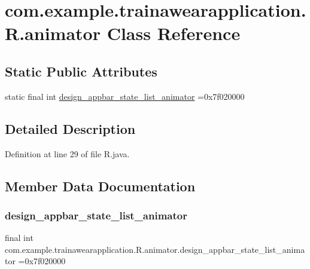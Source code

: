 \hypertarget{classcom_1_1example_1_1trainawearapplication_1_1_r_1_1animator}{}\section{com.\+example.\+trainawearapplication.\+R.\+animator Class Reference}
\label{classcom_1_1example_1_1trainawearapplication_1_1_r_1_1animator}
\subsection*{Static Public Attributes}
\begin{DoxyCompactItemize}
\item 
static final int \mbox{\hyperlink{classcom_1_1example_1_1trainawearapplication_1_1_r_1_1animator_a342dc81b170f7676d8031e7460f089be}{design\+\_\+appbar\+\_\+state\+\_\+list\+\_\+animator}} =0x7f020000
\end{DoxyCompactItemize}


\subsection{Detailed Description}


Definition at line 29 of file R.\+java.



\subsection{Member Data Documentation}
\mbox{\label{classcom_1_1example_1_1trainawearapplication_1_1_r_1_1animator_a342dc81b170f7676d8031e7460f089be}} 
\subsubsection{\texorpdfstring{design\_appbar\_state\_list\_animator}{design\_appbar\_state\_list\_animator}}
{\footnotesize\ttfamily final int com.\+example.\+trainawearapplication.\+R.\+animator.\+design\+\_\+appbar\+\_\+state\+\_\+list\+\_\+animator =0x7f020000\hspace{0.3cm}{\ttfamily [static]}}



